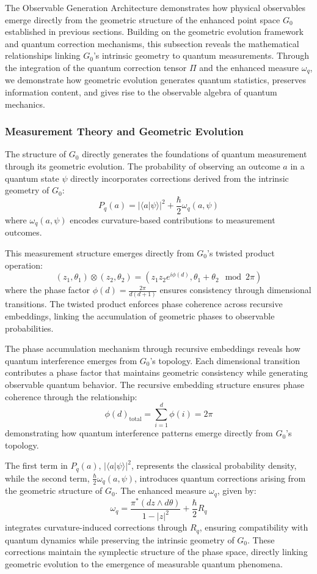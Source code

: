 \documentclass[10pt]{article}
\begin{document}
The Observable Generation Architecture demonstrates how physical observables emerge directly from the geometric structure of the enhanced point space $G_0$ established in previous sections. Building on the geometric evolution framework and quantum correction mechanisms, this subsection reveals the mathematical relationships linking $G_0$'s intrinsic geometry to quantum measurements. Through the integration of the quantum correction tensor \( \Pi \) and the enhanced measure \( \omega_q \), we demonstrate how geometric evolution generates quantum statistics, preserves information content, and gives rise to the observable algebra of quantum mechanics.

\subsubsection{Measurement Theory and Geometric Evolution}

The structure of $G_0$ directly generates the foundations of quantum measurement through its geometric evolution. The probability of observing an outcome \( a \) in a quantum state \( \psi \) directly incorporates corrections derived from the intrinsic geometry of $G_0$:
\[
   P_q(a) = |\langle a | \psi \rangle|^2 + \frac{\hbar}{2}\omega_q(a, \psi)
\]
where \( \omega_q(a, \psi) \) encodes curvature-based contributions to measurement outcomes.

This measurement structure emerges directly from $G_0$'s twisted product operation:
\[
   (z_1,\theta_1) \otimes (z_2,\theta_2) = (z_1z_2e^{i\phi(d)}, \theta_1 + \theta_2 \mod 2\pi)
\]
where the phase factor \( \phi(d) = \frac{2\pi}{d(d+1)} \) ensures consistency through dimensional transitions. The twisted product enforces phase coherence across recursive embeddings, linking the accumulation of geometric phases to observable probabilities.

The phase accumulation mechanism through recursive embeddings reveals how quantum interference emerges from $G_0$'s topology. Each dimensional transition contributes a phase factor that maintains geometric consistency while generating observable quantum behavior. The recursive embedding structure ensures phase coherence through the relationship:
\[
   \phi(d)_{\text{total}} = \sum_{i=1}^d \phi(i) = 2\pi
\]
demonstrating how quantum interference patterns emerge directly from $G_0$'s topology.

The first term in \( P_q(a) \), \( |\langle a | \psi \rangle|^2 \), represents the classical probability density, while the second term, \( \frac{\hbar}{2}\omega_q(a, \psi) \), introduces quantum corrections arising from the geometric structure of $G_0$. The enhanced measure \( \omega_q \), given by:
\[
   \omega_q = \frac{\pi^*(dz \wedge d\theta)}{1 - |z|^2} + \frac{\hbar}{2}R_q
\]
integrates curvature-induced corrections through \( R_q \), ensuring compatibility with quantum dynamics while preserving the intrinsic geometry of $G_0$. These corrections maintain the symplectic structure of the phase space, directly linking geometric evolution to the emergence of measurable quantum phenomena.
\end{document}
